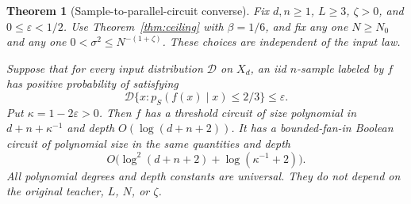 \documentclass[11pt]{article}
\newtheorem{theorem}{Theorem}[section]
\theoremstyle{remark}
\begin{document}
\begin{theorem}[Sample-to-parallel-circuit converse]
\label{thm:converse}
Fix $d,n\ge1$, $L\ge3$, $\zeta>0$, and $0\le\varepsilon<1/2$.
Use Theorem~\ref{thm:ceiling} with $\beta=1/6$, and fix any one
$N\ge N_0$ and any one $0<\sigma^2\le N^{-(1+\zeta)}$.
These choices are independent of the input law.

Suppose that for every input distribution $\mathcal D$ on $X_d$,
an iid $n$-sample labeled by $f$ has positive probability of satisfying
\[
 \mathcal D\{x:p_S(f(x)\mid x)\le2/3\}\le\varepsilon.
\]
Put $\kappa=1-2\varepsilon>0$. Then $f$ has a threshold circuit of
size polynomial in $d+n+\kappa^{-1}$ and depth $O(\log(d+n+2))$.
It has a bounded-fan-in Boolean circuit of polynomial size in the same
quantities and depth
\[
 O\bigl(\log^2(d+n+2)+\log(\kappa^{-1}+2)\bigr).
\]
All polynomial degrees and depth constants are universal. They do
not depend on the original teacher, $L$, $N$, or $\zeta$.
\end{theorem}
\end{document}
